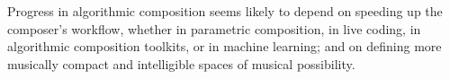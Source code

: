 \documentclass[11pt]{scrartcl}
\begin{document}
Progress in algorithmic composition seems likely to depend on speeding up the composer's workflow, whether in parametric composition, in live coding, in algorithmic composition toolkits, or  in machine learning; and on defining more musically compact and intelligible spaces of musical possibility.









%
\printbibliography
\end{document}
